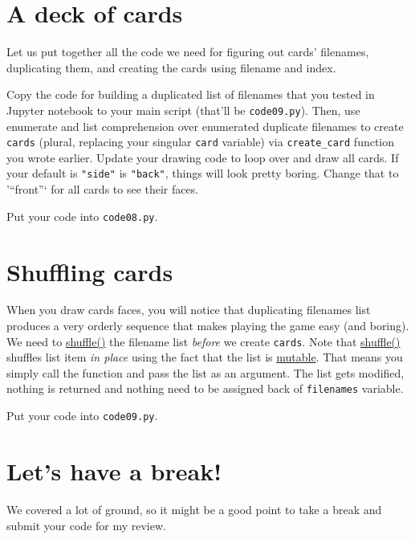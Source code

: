 \documentclass[
]{book}
\begin{document}
\hypertarget{a-deck-of-cards}{%
\section{A deck of cards}\label{a-deck-of-cards}}

Let us put together all the code we need for figuring out cards' filenames, duplicating them, and creating the cards using filename and index.

Copy the code for building a duplicated list of filenames that you tested in Jupyter notebook to your main script (that'll be \texttt{code09.py}). Then, use enumerate and list comprehension over enumerated duplicate filenames to create \texttt{cards} (plural, replacing your singular \texttt{card} variable) via \texttt{create\_card} function you wrote earlier. Update your drawing code to loop over and draw all cards. If your default is \texttt{"side"} is \texttt{"back"}, things will look pretty boring. Change that to '``front''` for all cards to see their faces.

Put your code into \texttt{code08.py}.

\hypertarget{shuffle}{%
\section{Shuffling cards}\label{shuffle}}

When you draw cards faces, you will notice that duplicating filenames list produces a very orderly sequence that makes playing the game easy (and boring). We need to \href{https://docs.python.org/3/library/random.html\#random.shuffle}{shuffle()} the filename list \emph{before} we create \texttt{cards}. Note that \href{https://docs.python.org/3/library/random.html\#random.shuffle}{shuffle()} shuffles list item \emph{in place} using the fact that the list is \protect\hyperlink{mutable-objects}{mutable}. That means you simply call the function and pass the list as an argument. The list gets modified, nothing is returned and nothing need to be assigned back of \texttt{filenames} variable.

Put your code into \texttt{code09.py}.

\hypertarget{lets-have-a-break}{%
\section{Let's have a break!}\label{lets-have-a-break}}

We covered a lot of ground, so it might be a good point to take a break and submit your code for my review.
\end{document}

